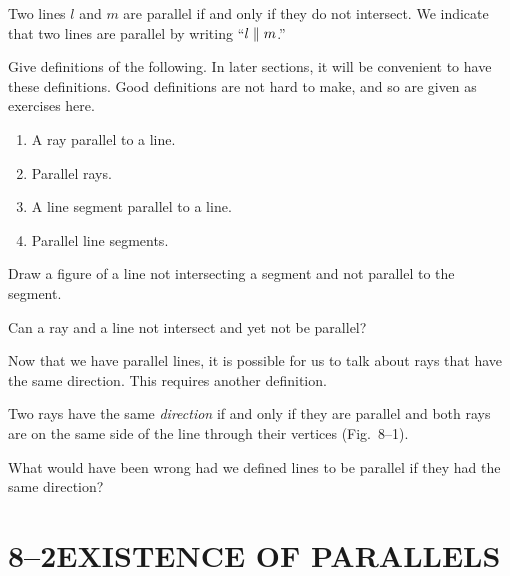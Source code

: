 \documentclass[11pt]{book}
\begin{document}
\begin{definition}
Two lines $l$ and $m$ are parallel if and only if they do not intersect. We
indicate that two lines are parallel by writing ``$l \mathrel{\|} m$.''
\end{definition}

\begin{exercisecols}
\begin{exlist}
\item Give definitions of the following. In later sections, it will be
  convenient to have these definitions. Good definitions are not hard to make,
  and so are given as exercises here.
  \begin{enumerate}[label=(\alph*), leftmargin=1.8em, topsep=2pt, itemsep=1pt]
    \item A ray parallel to a line.
    \item Parallel rays.
    \item A line segment parallel to a line.
    \item Parallel line segments.
  \end{enumerate}
\item Draw a figure of a line not intersecting a segment and not parallel to
  the segment.
\item Can a ray and a line not intersect and yet not be parallel?
\end{exlist}
\end{exercisecols}

Now that we have parallel lines, it is possible for us to talk about rays that
have the same direction. This requires another definition.

\begin{definition}
Two rays have the same \emph{direction} if and only if they are parallel and
both rays are on the same side of the line through their vertices
(Fig.~8--1).
\end{definition}

\FIGVIIIONE

\noindent What would have been wrong had we defined lines to be parallel if
they had the same direction?

\section*{8--2\quad EXISTENCE OF PARALLELS}
\end{document}

